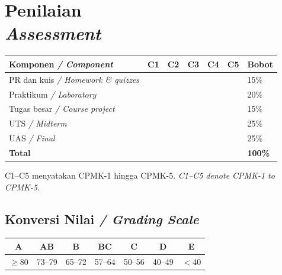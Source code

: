 \documentclass[11pt,a4paper]{article}
\newcommand{\en}[1]{{\color{black!60}\textit{#1}}}
\newcommand{\bsection}[2]{\Needspace{12\baselineskip}\section[#1 / #2]{#1\\[-2pt]{\large\en{#2}}}}
\newcommand{\bsubsection}[2]{\Needspace{8\baselineskip}\subsection[#1 / #2]{#1 \en{/ #2}}}
\begin{document}
\bsection{Penilaian}{Assessment}
\begin{table}[H]
	\centering
	\begin{tabularx}{\textwidth}{@{}L{4.6cm} c c c c c Y@{}}
		\toprule
		\textbf{Komponen} \en{/ Component} & \textbf{C1} & \textbf{C2} & \textbf{C3} & \textbf{C4} & \textbf{C5} & \textbf{Bobot} \\
		\midrule
		PR dan kuis \en{/ Homework \& quizzes} & \checkmark & \checkmark & \checkmark & \checkmark &            & 15\% \\
		Praktikum \en{/ Laboratory}             & \checkmark &            & \checkmark & \checkmark & \checkmark & 20\% \\
		Tugas besar \en{/ Course project}       &            & \checkmark & \checkmark & \checkmark & \checkmark & 15\% \\
		UTS \en{/ Midterm}                      & \checkmark & \checkmark & \checkmark &            &            & 25\% \\
		UAS \en{/ Final}                        &            & \checkmark & \checkmark &            &            & 25\% \\
		\midrule
		\textbf{Total}                          &            &            &            &            &            & \textbf{100\%} \\
		\bottomrule
	\end{tabularx}
\end{table}
C1--C5 menyatakan CPMK-1 hingga CPMK-5. \en{C1--C5 denote CPMK-1 to CPMK-5.}

\bsubsection{Konversi Nilai}{Grading Scale}
\begin{table}[H]
	\centering
	\begin{tabular}{@{}ccccccc@{}}
		\toprule
		A & AB & B & BC & C & D & E \\
		\midrule
		$\geq 80$ & 73--79 & 65--72 & 57--64 & 50--56 & 40--49 & $< 40$ \\
		\bottomrule
	\end{tabular}
\end{table}
\end{document}
